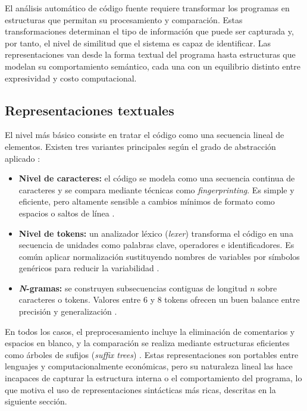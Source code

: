 El análisis automático de código fuente requiere transformar los programas 
en estructuras que permitan su procesamiento y comparación. Estas 
transformaciones determinan el tipo de información que puede ser capturada 
y, por tanto, el nivel de similitud que el sistema es capaz de identificar. 
Las representaciones van desde la forma textual del programa hasta 
estructuras que modelan su comportamiento semántico, cada una con un 
equilibrio distinto entre expresividad y costo computacional.

\subsection{Representaciones textuales}

El nivel más básico consiste en tratar el código como una secuencia lineal 
de elementos. Existen tres variantes principales según el grado de 
abstracción aplicado \cite{Roy2007Survey}:

\begin{itemize}
    \item \textbf{Nivel de caracteres:} el código se modela como una 
    secuencia continua de caracteres y se compara mediante técnicas como 
    \textit{fingerprinting}. Es simple y eficiente, pero altamente sensible 
    a cambios mínimos de formato como espacios o saltos de línea 
    \cite{Roy2007Survey}.

    \item \textbf{Nivel de tokens:} un analizador léxico (\textit{lexer}) 
    transforma el código en una secuencia de unidades como palabras clave, 
    operadores e identificadores. Es común aplicar normalización sustituyendo
    nombres de variables por símbolos genéricos para reducir la 
    variabilidad \cite{Roy2007Survey}.

    \item \textbf{\textit{N}-gramas:} se construyen subsecuencias contiguas 
    de longitud $n$ sobre caracteres o tokens. Valores entre 6 y 8 tokens 
    ofrecen un buen balance entre precisión y generalización 
    \cite{Burrows2007Ngrams}.
\end{itemize}

En todos los casos, el preprocesamiento incluye la eliminación de 
comentarios y espacios en blanco, y la comparación se realiza mediante 
estructuras eficientes como árboles de sufijos (\textit{suffix trees}) 
\cite{Roy2007Survey}. Estas representaciones son portables entre lenguajes 
y computacionalmente económicas, pero su naturaleza lineal las hace 
incapaces de capturar la estructura interna o el comportamiento del 
programa, lo que motiva el uso de representaciones sintácticas más ricas, 
descritas en la siguiente sección.



